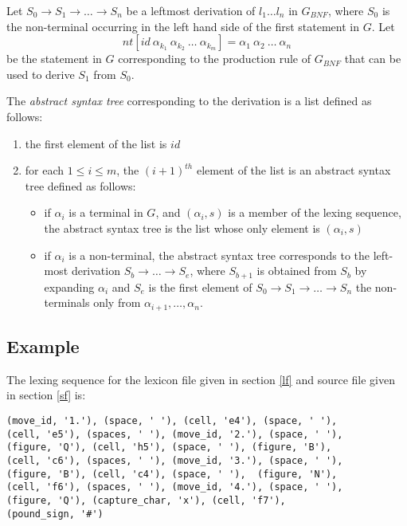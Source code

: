 \documentclass[a4paper,10pt]{article}
\begin{document}
Let $S_0 \to S_1 \to \ldots \to S_n$ be a leftmost derivation of $l_1\ldots l_n$ in $G_{BNF}$, where $S_0$ is the non-terminal occurring in the left hand side of the first statement in $G$. 
Let $$nt[id~\alpha_{k_1}~\alpha_{k_2}~\ldots~\alpha_{k_m}] = \alpha_1~\alpha_2~\ldots~\alpha_n  $$  be the statement in $G$ corresponding to the production rule of $G_{BNF}$ that can be used to derive $S_1$ from $S_0$.

The \textit{abstract syntax tree} corresponding to the derivation is a list defined as follows:

\begin{enumerate}
\item the first element of the list is $id$
\item for each $1 \le i \le m$, the $(i+1)^{th}$ element of the list is an abstract syntax tree defined as follows:
\begin{itemize}
\item if $\alpha_i$ is a terminal in $G$, and  $(\alpha_i,s)$ is a member of the lexing sequence,
      the abstract syntax tree is the list whose only element is   $(\alpha_i,s)$
\item if $\alpha_i$ is a non-terminal, the abstract syntax tree corresponds to the left-most derivation
$S_b \to \ldots \to S_e$, where $S_{b+1}$ is obtained from $S_{b}$ by expanding $\alpha_i$ and $S_e$ is the first element of  $S_0 \to S_1 \to \ldots \to S_n$   the non-terminals only  from $\alpha_{i+1}, \ldots, \alpha_{n}$.  
  
\end{itemize} 
  
\end{enumerate}
\subsection{Example}

The lexing sequence for the  lexicon file given in section \ref{lf} and source file given in section \ref{sf} is:

\begin{verbatim}
(move_id, '1.'), (space, ' '), (cell, 'e4'), (space, ' '), 
(cell, 'e5'), (spaces, ' '), (move_id, '2.'), (space, ' '), 
(figure, 'Q'), (cell, 'h5'), (space, ' '), (figure, 'B'),
(cell, 'c6'), (spaces, ' '), (move_id, '3.'), (space, ' '), 
(figure, 'B'), (cell, 'c4'), (space, ' '),  (figure, 'N'), 
(cell, 'f6'), (spaces, ' '), (move_id, '4.'), (space, ' '), 
(figure, 'Q'), (capture_char, 'x'), (cell, 'f7'),  
(pound_sign, '#')
\end{verbatim} 
\end{document}
